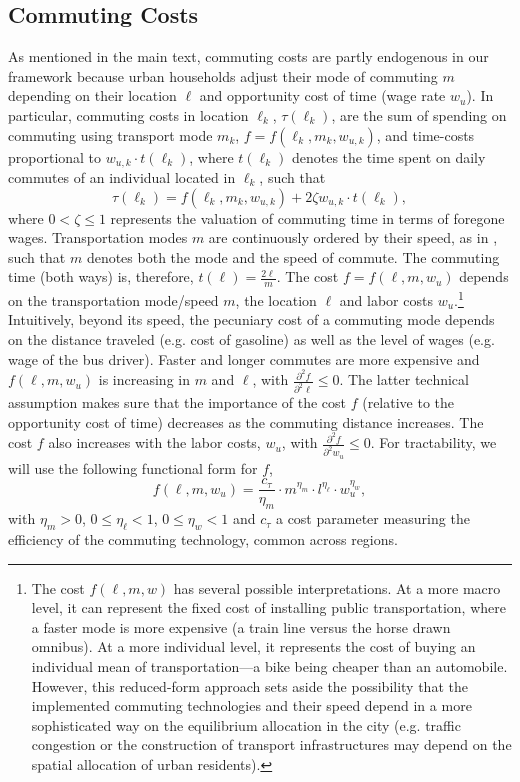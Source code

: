 \documentclass[11pt]{report}
\begin{document}
\subsection{Commuting Costs}\label{B-sec:extensions-commute} 
As mentioned in the main text, commuting costs are partly endogenous in our framework because urban households adjust their mode of commuting $m$ depending on their location $\ell$ and opportunity cost of time (wage rate $w_u$). In particular, commuting costs in location $\ell_k$, $\tau(\ell_k)$, are the sum of spending on commuting using transport mode $m_k$, $f=f(\ell_k,m_k,w_{u,k})$, and time-costs proportional to $w_{u,k} \cdot t(\ell_k)$, where $t(\ell_k)$ denotes the time spent on daily commutes of an individual located in $\ell_k$, such that
\begin{equation}
	\tau(\ell_k)=f(\ell_k,m_k,w_{u,k})+2\zeta w_{u,k}  \cdot t(\ell_k), \label{B-eq:tau1}
\end{equation}
where $0<\zeta \leq 1$ represents the valuation of commuting time in terms of foregone wages. Transportation modes $m$ are continuously ordered by their speed, as in \cite{desalvo1996income}, such that $m$ denotes both the mode and the speed of commute. The commuting time (both ways) is, therefore, $t(\ell)=\frac{2\ell}{m}$. The cost $f=f(\ell,m,w_u)$ depends on the transportation mode/speed $m$, the location $\ell$ and labor costs $w_u$.\footnote{The cost $f(\ell,m,w)$ has several possible interpretations. At a more macro level, it can represent the fixed cost of installing public transportation, where a faster mode is more expensive (a train line versus the horse drawn omnibus). At a more individual level, it represents the cost of buying an individual mean of transportation---a bike being cheaper than an automobile. However, this reduced-form approach sets aside the possibility that the implemented commuting technologies and their speed depend in a more sophisticated way on the equilibrium allocation in the city (e.g. traffic congestion or the construction of transport infrastructures may depend on the spatial allocation of urban residents).} Intuitively, beyond its speed, the pecuniary cost of a commuting mode depends on the distance traveled (e.g. cost of gasoline) as well as the level of wages (e.g. wage of the bus driver). Faster and longer commutes are more expensive and $f(\ell,m,w_u)$ is increasing in $m$ and $\ell$, with $\frac{\partial^2 f}{\partial^2 \ell}\leq0$. The latter technical assumption makes sure that the importance of the cost $f$ (relative to the opportunity cost of time) decreases as the commuting distance increases. The cost $f$ also increases with the labor costs, $w_u$, with $\frac{\partial^2 f}{\partial^2 w_u}\leq0$. For tractability, we will use the following functional form for $f$,
\begin{equation}
f(\ell,m,w_u)=\frac{c_\tau}{\eta_m} \cdot m^{\eta_m} \cdot  l^{\eta_\ell} \cdot  w_u^{\eta_w}, \label{B-eq:flmw2}
\end{equation}
with $\eta_m>0$, $0\leq\eta_\ell<1$, $0\leq\eta_w<1$ and $c_\tau$ a cost parameter measuring the efficiency of the commuting technology, common across regions. 
\end{document}
